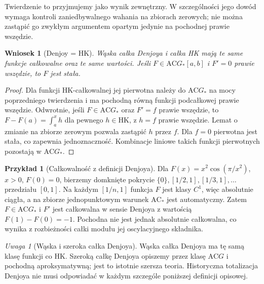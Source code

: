 \documentclass[11pt,a4paper]{article}
\numberwithin{equation}{section}
\theoremstyle{plain}
\newtheorem{wniosek}[twierdzenie]{Wniosek}
\theoremstyle{definition}
\newtheorem{przyklad}[twierdzenie]{Przykład}
\theoremstyle{remark}
\newtheorem{uwaga}[twierdzenie]{Uwaga}
\newcommand{\AC}{\mathrm{AC}}
\newcommand{\HK}{\mathrm{HK}}
\begin{document}
Twierdzenie to przyjmujemy jako wynik zewnętrzny. W szczególności jego dowód wymaga kontroli zaniedbywalnego wahania na zbiorach zerowych; nie można zastąpić go zwykłym argumentem opartym jedynie na pochodnej prawie wszędzie.
\begin{wniosek}[Denjoy = HK]
Wąska całka Denjoya i całka HK mają te same funkcje całkowalne oraz te same wartości. Jeśli $F\in\AC G_*[a,b]$ i $F'=0$ prawie wszędzie, to $F$ jest stała.
\end{wniosek}
\begin{proof}
Dla funkcji HK-całkowalnej jej pierwotna należy do $\AC G_*$ na mocy poprzedniego twierdzenia i ma pochodną równą funkcji podcałkowej prawie wszędzie. Odwrotnie, jeśli $F\in\AC G_*$ oraz $F'=f$ prawie wszędzie, to $F-F(a)=\int_a^x h$ dla pewnego $h\in\HK$, z $h=f$ prawie wszędzie. Lemat o zmianie na zbiorze zerowym pozwala zastąpić $h$ przez $f$. Dla $f=0$ pierwotna jest stała, co zapewnia jednoznaczność. Kombinacje liniowe takich funkcji pierwotnych pozostają w $\AC G_*$.
\end{proof}
\begin{przyklad}[Całkowalność z definicji Denjoya]
Dla $F(x)=x^2\cos(\pi/x^2)$, $x>0$, $F(0)=0$, bierzemy domknięte pokrycie $\{0\},[1/2,1],[1/3,1],\dots$ przedziału $[0,1]$. Na każdym $[1/n,1]$ funkcja $F$ jest klasy $C^1$, więc absolutnie ciągła, a na zbiorze jednopunktowym warunek $\AC_*$ jest automatyczny. Zatem $F\in\AC G_*$ i $F'$ jest całkowalna w sensie Denjoya z wartością $F(1)-F(0)=-1$. Pochodna nie jest jednak absolutnie całkowalna, co wynika z rozbieżności całki modułu jej oscylacyjnego składnika.
\end{przyklad}
\begin{uwaga}[Wąska i szeroka całka Denjoya]
Wąska całka Denjoya ma tę samą klasę funkcji co HK. Szeroką całkę Denjoya opiszemy przez klasę $\AC G$ i pochodną aproksymatywną; jest to istotnie szersza teoria. Historyczna totalizacja Denjoya nie musi odpowiadać w każdym szczególe poniższej definicji opisowej.
\end{uwaga}

\end{document}
